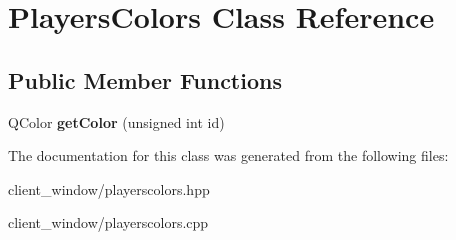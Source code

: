 \hypertarget{classPlayersColors}{}\section{Players\+Colors Class Reference}
\label{classPlayersColors}
\subsection*{Public Member Functions}
\begin{DoxyCompactItemize}
\item 
Q\+Color {\bfseries get\+Color} (unsigned int id)\hypertarget{classPlayersColors_a3fe3263d252b9fc02b71c976e9e31a94}{}\label{classPlayersColors_a3fe3263d252b9fc02b71c976e9e31a94}

\end{DoxyCompactItemize}


The documentation for this class was generated from the following files\+:\begin{DoxyCompactItemize}
\item 
client\+\_\+window/playerscolors.\+hpp\item 
client\+\_\+window/playerscolors.\+cpp\end{DoxyCompactItemize}
